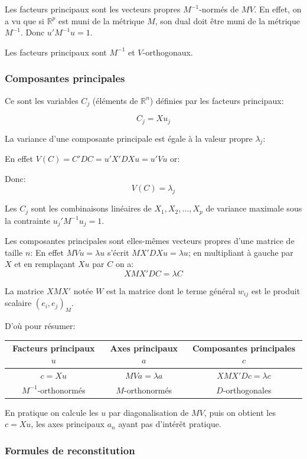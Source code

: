 \documentclass[12pt,a4paper]{article}
\begin{document}
Les facteurs principaux sont les vecteurs propres $M^{-1}$-normés de $M V$. En effet, on a vu
que si $\mathbb{R}^p$ est muni de la métrique $M$, son dual doit être muni de la métrique $M^{-1}$.
Donc $u'M^{-1} u = 1$.

Les facteurs principaux sont $M^{-1}$ et $V$-orthogonaux.

\subsubsection{Composantes principales}

Ce sont les variables $C_j$ (éléments de $\mathbb{R}^n$) définies par les facteurs principaux:

\[C_j = X u_j\]

La variance d'une composante principale est égale à la valeur propre $\lambda_j$:

En effet $V(C) = C'D C = u' X' D X u = u' V u$ or:

Donc:
\[V(C) = \lambda_j\]

Les $C_j$ sont les combinaisons linéaires de $X_1, X_2, \dots, X_p$ de variance maximale sous
la contrainte $u_j' M^{-1} u_j = 1$.

Les composantes principales sont elles-mêmes vecteurs propres d'une matrice de taille $n$:
En effet $M V u = \lambda u$ s'écrit $M X' D X u = \lambda u$; en multipliant à gauche par $X$ et en remplaçant
$X u$ par $C$ on a:
\[X M X' D C = \lambda C\]

La matrice $X M X'$ notée $W$ est la matrice dont le terme général $w_{ij}$ est le produit scalaire
$(e_i, e_j)_{M}$.

D'où pour résumer:

\begin{tabular}{|c|c|c|}
\hline
Facteurs principaux $u$ & Axes principaux $a$ & Composantes principales $c$ \\
\hline
$c = X u$ & $M V a = \lambda a$ & $X M X' D c = \lambda c$ \\
$M^{-1}$-orthonormés & $M$-orthonormés & $D$-orthogonales \\
\hline
\end{tabular}

En pratique on calcule les $u$ par diagonalisation de $M V$, puis on obtient les $c = X u$, les
axes principaux $a_n$ ayant pas d'intérêt pratique.

\subsubsection{Formules de reconstitution}
\end{document}
